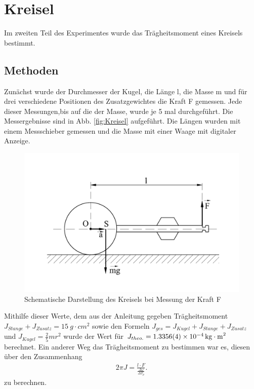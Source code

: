 \section{Kreisel}
Im zweiten Teil des Experimentes wurde das Trägheitsmoment eines Kreisels bestimmt.
\subsection{Methoden}\label{kap:KreiselMethoden}
Zunächst wurde der Durchmesser der Kugel, die Länge l, die Masse m und für drei verschiedene Positionen des Zusatzgewichtes die Kraft F gemessen.
Jede dieser Messungen,bis auf die der Masse, wurde je 5 mal durchgeführt. Die Messergebnisse sind in Abb. \ref{fig:Kreisel} aufgeführt.
Die Längen  wurden mit einem Messschieber gemessen und die Masse mit einer Waage mit digitaler Anzeige.
\begin{figure}[h]
	\centering
	\includegraphics[width=\linewidth]{res/KreiselAufbau.pdf}
	\caption{Schematische Darstellung des Kreisels bei Messung der Kraft F\cite{lw}}
	\label{fig:kreisel}
\end{figure}
Mithilfe dieser Werte, dem aus der Anleitung gegeben Trägheitsmoment $J_{Stange}+J_{Zusatz}=\SI{15}{g \cdot cm^2}$ sowie den Formeln $J_{ges}=J_{Kugel}+J_{Stange}+J_{Zusatz}$ und $J_{Kugel}=\frac{2}{5}mr^2$ wurde der %
Wert für $J_{theo.}=\SI{1,3356+-0,0004e-4}{kg \cdot m^2}$ berechnet. Ein anderer Weg das Trägheitsmoment zu bestimmen war es, diesen über den Zusammenhang 
\begin{align}
2 \pi J= \frac{l \cdot F}{\frac{\Delta \omega}{\Delta T_p}} \label{eq:zusJlF}.
\end{align}
zu berechnen.
